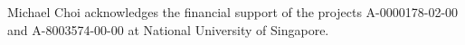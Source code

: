 \documentclass[EJP]{ejpecp} %
\begin{document}

%
%
\clearpage




\begin{acks}
Michael Choi acknowledges the financial support of the projects A-0000178-02-00 and A-8003574-00-00 at National University of Singapore.
\end{acks}


\end{document}
